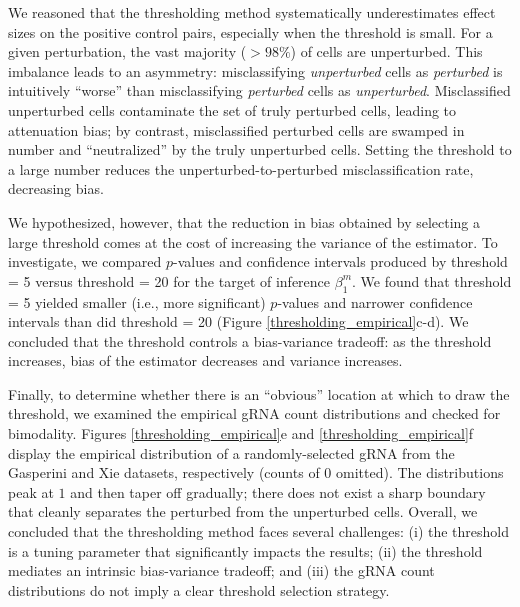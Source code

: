 \documentclass[12pt]{article}
\begin{document}
We reasoned that the thresholding method systematically underestimates effect sizes on the positive control pairs, especially when the threshold is small. For a given perturbation, the vast majority ($>98\%$) of cells are unperturbed. This imbalance leads to an asymmetry: misclassifying \textit{unperturbed} cells as \textit{perturbed} is intuitively ``worse'' than misclassifying \textit{perturbed} cells as \textit{unperturbed}. Misclassified unperturbed cells contaminate the set of truly perturbed cells, leading to attenuation bias; by contrast, misclassified perturbed cells are swamped in number and ``neutralized'' by the truly unperturbed cells. Setting the threshold to a large number reduces the unperturbed-to-perturbed misclassification rate, decreasing bias.

We hypothesized, however, that the reduction in bias obtained by selecting a large threshold comes at the cost of increasing the variance of the estimator. To investigate, we compared $p$-values and confidence intervals produced by threshold = 5 versus threshold = 20 for the target of inference $\beta^m_1$. We found that threshold = 5 yielded smaller (i.e., more significant) $p$-values and narrower confidence intervals than did threshold = 20 (Figure \ref{thresholding_empirical}c-d). We concluded that the threshold controls a bias-variance tradeoff: as the threshold increases, bias of the estimator decreases and variance increases.

Finally, to determine whether there is an ``obvious'' location at which to draw the threshold, we examined the empirical gRNA count distributions and checked for bimodality. Figures \ref{thresholding_empirical}e and \ref{thresholding_empirical}f display the empirical distribution of a randomly-selected gRNA from the Gasperini and Xie datasets, respectively (counts of $0$ omitted). The distributions peak at $1$ and then taper off gradually; there does not exist a sharp boundary that cleanly separates the perturbed from the unperturbed cells. Overall, we concluded that the thresholding method faces several challenges: (i) the threshold is a tuning parameter that significantly impacts the results; (ii) the threshold mediates an intrinsic bias-variance tradeoff; and (iii) the gRNA count distributions do not imply a clear threshold selection strategy.
\end{document}
